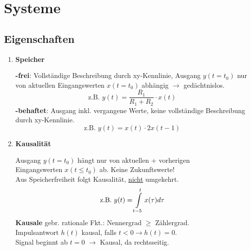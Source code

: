 \clearpage
\section{Systeme}
\subsection{Eigenschaften}
\begin{enumerate}[leftmargin=*]
\small
  \item{\textbf{Speicher}}
  
          \textbf{-frei}: Vollständige Beschreibung durch xy-Kennlinie, Ausgang $y(t=t_0)$ nur von aktuellen Eingangswerten $x(t=t_0)$ abhängig $\rightarrow$ gedächtnislos.\\
          \[
              \text{z.B. \ }y(t)=\frac{R_1}{R_1+R_2}\cdot x(t)
          \]
          \textbf{-behaftet}: Ausgang inkl. vergangene Werte, keine vollständige Beschreibung durch xy-Kennlinie.\\
          \[
              \text{z.B. \ }y(t) = x(t)\cdot 2x(t-1)
          \]
  \item{\textbf{Kausalit\"at}}
  
           Ausgang $y(t=t_0)$ hängt nur von aktuellen + vorherigen\\
           Eingangswerten $x(t\le t_0)$ ab. Keine Zukunftswerte!\\
           Aus Speicherfreiheit folgt Kausalität, \underline{nicht} umgekehrt.
          \[
              \text{z.B.\ }y(t) =
              \int\displaylimits_{t-5}^{t}x(\tau)d\tau
          \]
 \textbf{Kausale} gebr. rationale Fkt.: Nennergrad $\ge$ Zählergrad.\\
 Impulsantwort $h(t)$ kausal, falls $t<0 \rightarrow h(t)=0$.\\
 Signal beginnt ab $t=0$ $\rightarrow$ Kausal, da rechtsseitig.
 

\end{enumerate}
